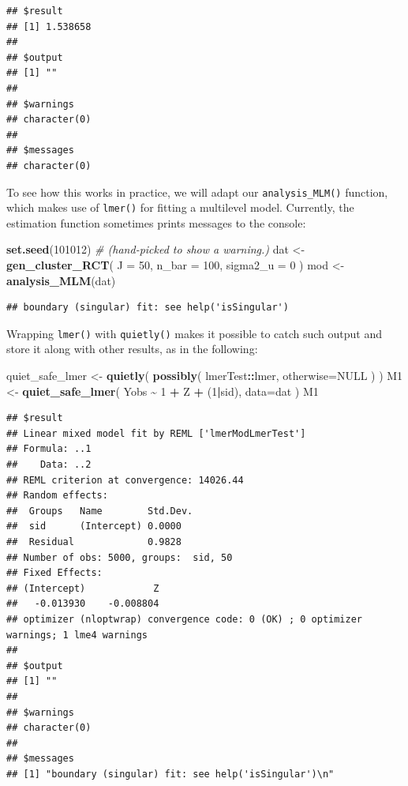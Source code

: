 \documentclass[
]{book}
\newenvironment{Shaded}{\begin{snugshade}}{\end{snugshade}}
\newcommand{\AttributeTok}[1]{\textcolor[rgb]{0.13,0.29,0.53}{#1}}
\newcommand{\CommentTok}[1]{\textcolor[rgb]{0.56,0.35,0.01}{\textit{#1}}}
\newcommand{\ConstantTok}[1]{\textcolor[rgb]{0.56,0.35,0.01}{#1}}
\newcommand{\DecValTok}[1]{\textcolor[rgb]{0.00,0.00,0.81}{#1}}
\newcommand{\FunctionTok}[1]{\textcolor[rgb]{0.13,0.29,0.53}{\textbf{#1}}}
\newcommand{\NormalTok}[1]{#1}
\newcommand{\OtherTok}[1]{\textcolor[rgb]{0.56,0.35,0.01}{#1}}
\newcommand{\SpecialCharTok}[1]{\textcolor[rgb]{0.81,0.36,0.00}{\textbf{#1}}}
\begin{document}
\begin{verbatim}
## $result
## [1] 1.538658
## 
## $output
## [1] ""
## 
## $warnings
## character(0)
## 
## $messages
## character(0)
\end{verbatim}

To see how this works in practice, we will adapt our \texttt{analysis\_MLM()} function, which makes use of \texttt{lmer()} for fitting a multilevel model.
Currently, the estimation function sometimes prints messages to the console:

\begin{Shaded}
\begin{Highlighting}[]
\FunctionTok{set.seed}\NormalTok{(}\DecValTok{101012}\NormalTok{)  }\CommentTok{\# (hand{-}picked to show a warning.)}
\NormalTok{dat }\OtherTok{\textless{}{-}} \FunctionTok{gen\_cluster\_RCT}\NormalTok{( }\AttributeTok{J =} \DecValTok{50}\NormalTok{, }\AttributeTok{n\_bar =} \DecValTok{100}\NormalTok{, }\AttributeTok{sigma2\_u =} \DecValTok{0}\NormalTok{ )}
\NormalTok{mod }\OtherTok{\textless{}{-}} \FunctionTok{analysis\_MLM}\NormalTok{(dat)}
\end{Highlighting}
\end{Shaded}

\begin{verbatim}
## boundary (singular) fit: see help('isSingular')
\end{verbatim}

Wrapping \texttt{lmer()} with \texttt{quietly()} makes it possible to catch such output and store it along with other results, as in the following:

\begin{Shaded}
\begin{Highlighting}[]
\NormalTok{quiet\_safe\_lmer }\OtherTok{\textless{}{-}} \FunctionTok{quietly}\NormalTok{( }\FunctionTok{possibly}\NormalTok{( lmerTest}\SpecialCharTok{::}\NormalTok{lmer, }\AttributeTok{otherwise=}\ConstantTok{NULL}\NormalTok{ ) )}
\NormalTok{M1 }\OtherTok{\textless{}{-}} \FunctionTok{quiet\_safe\_lmer}\NormalTok{( Yobs }\SpecialCharTok{\textasciitilde{}} \DecValTok{1} \SpecialCharTok{+}\NormalTok{ Z }\SpecialCharTok{+}\NormalTok{ (}\DecValTok{1}\SpecialCharTok{|}\NormalTok{sid), }\AttributeTok{data=}\NormalTok{dat )}
\NormalTok{M1}
\end{Highlighting}
\end{Shaded}

\begin{verbatim}
## $result
## Linear mixed model fit by REML ['lmerModLmerTest']
## Formula: ..1
##    Data: ..2
## REML criterion at convergence: 14026.44
## Random effects:
##  Groups   Name        Std.Dev.
##  sid      (Intercept) 0.0000  
##  Residual             0.9828  
## Number of obs: 5000, groups:  sid, 50
## Fixed Effects:
## (Intercept)            Z  
##   -0.013930    -0.008804  
## optimizer (nloptwrap) convergence code: 0 (OK) ; 0 optimizer warnings; 1 lme4 warnings 
## 
## $output
## [1] ""
## 
## $warnings
## character(0)
## 
## $messages
## [1] "boundary (singular) fit: see help('isSingular')\n"
\end{verbatim}
\end{document}
